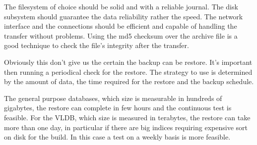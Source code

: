 The filesystem of choice should be solid and with a reliable journal. The disk subsystem should 
guarantee the data reliability rather the speed. The network interface and the connections should be 
efficient and capable of handling the transfer without problems. Using the md5 checksum over the archive 
file is a good technique to check the file's integrity after the transfer.\newline

Obviously  this don't give us the certain the backup can be restore. It's important then running a 
periodical check for the restore. The strategy to use is determined by the amount 
of data, the time required for the restore and the backup schedule.\newline

The general purpose databases, which size is measurable in hundreds of gigabytes, the restore can 
complete in few hours and the continuous test is feasible. For the VLDB, which size is measured in 
terabytes, the restore can take more than one day, in particular if there are big indices requiring 
expensive sort on disk for the build. In this case a test on a weekly basis is more feasible.